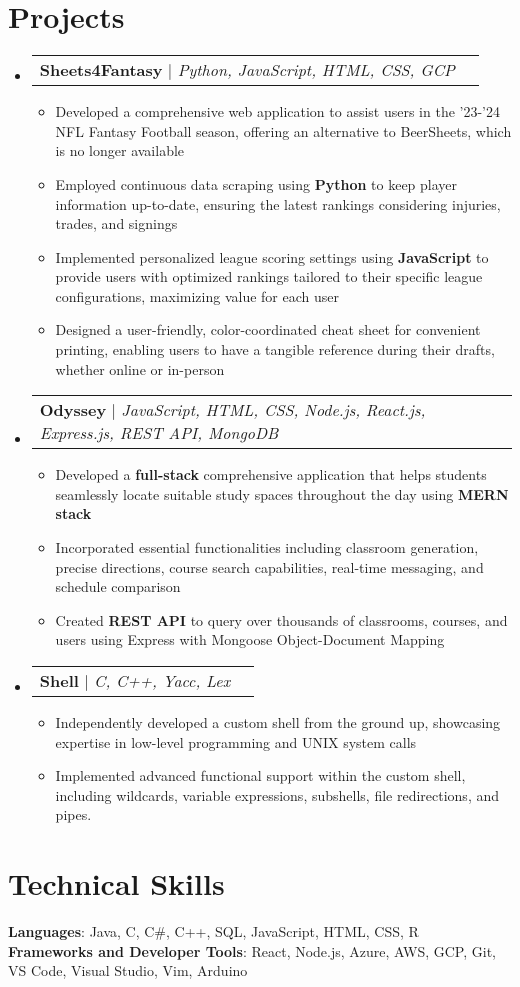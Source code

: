 \documentclass[letterpaper,11pt]{article}
\makeatletter
\newcommand{\resumeItem}[1]{
  \item\small{
    {#1 \vspace{-2pt}}
  }
}
\newcommand{\resumeProjectHeading}[2]{
    \item
    \begin{tabular*}{0.97\textwidth}{l@{\extracolsep{\fill}}r}
      \small#1 & #2 \\
    \end{tabular*}\vspace{-7pt}
}
\newcommand{\resumeSubHeadingListStart}{\begin{itemize}[leftmargin=0.15in, label={}]}
\newcommand{\resumeSubHeadingListEnd}{\end{itemize}}
\newcommand{\resumeItemListStart}{\begin{itemize}}
\newcommand{\resumeItemListEnd}{\end{itemize}\vspace{-5pt}}
\makeatother
\begin{document}
\section{Projects}
    \resumeSubHeadingListStart
      \resumeProjectHeading
          {\textbf{Sheets4Fantasy} $|$ \emph{Python, JavaScript, HTML, CSS, GCP}}{}
          \resumeItemListStart
            \resumeItem{Developed a comprehensive web application to assist users in the '23-'24 NFL Fantasy Football season, offering an alternative to BeerSheets, which is no longer available}
            \resumeItem{Employed continuous data scraping using \textbf{Python} to keep player information up-to-date, ensuring the latest rankings considering injuries, trades, and signings}
            \resumeItem{Implemented personalized league scoring settings using \textbf{JavaScript} to provide users with optimized rankings tailored to their specific league configurations, maximizing value for each user}
            \resumeItem{Designed a user-friendly, color-coordinated cheat sheet for convenient printing, enabling users to have a tangible reference during their drafts, whether online or in-person}
          \resumeItemListEnd
      \resumeProjectHeading
          {\textbf{Odyssey} $|$ \emph{JavaScript, HTML, CSS, Node.js, React.js, Express.js, REST API, MongoDB}}{}
          \resumeItemListStart
            \resumeItem{Developed a \textbf{full-stack} comprehensive application that helps students seamlessly locate suitable study spaces throughout the day using \textbf{MERN stack}}
            \resumeItem{Incorporated essential functionalities including classroom generation, precise directions, course search capabilities, real-time messaging, and schedule comparison}
            \resumeItem{Created \textbf{REST API} to query over thousands of classrooms, courses, and users using Express with Mongoose Object-Document Mapping}
          \resumeItemListEnd
      \resumeProjectHeading
          {\textbf{Shell} $|$ \emph{C, C++, Yacc, Lex}}{}
          \resumeItemListStart
            \resumeItem{Independently developed a custom shell from the ground up, showcasing expertise in low-level programming and UNIX system calls}
            \resumeItem{Implemented advanced functional support within the custom shell, including wildcards, variable expressions, subshells, file redirections, and pipes.}
          \resumeItemListEnd
    \resumeSubHeadingListEnd

%
\section{Technical Skills}
 \begin{itemize}[leftmargin=0.15in, label={}]
    \small{\item{
     \textbf{Languages}{: Java, C, C\#, C++, SQL, JavaScript, HTML, CSS, R} \\
     \textbf{Frameworks and Developer Tools}{: React, Node.js, Azure, AWS, GCP, Git, VS Code, Visual Studio, Vim, Arduino} \\
    }}
 \end{itemize}


\end{document}
